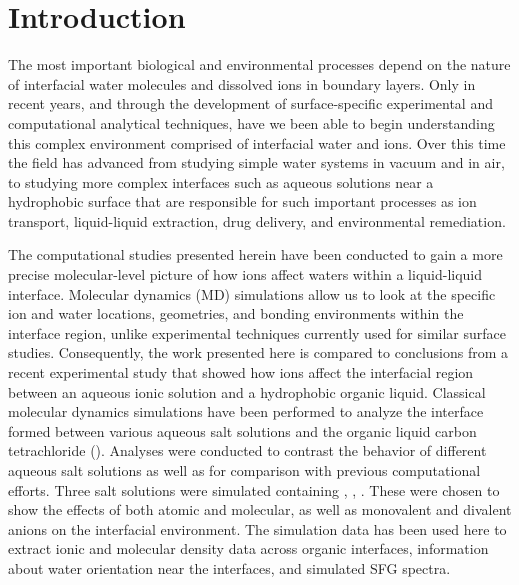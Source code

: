 \section{Introduction}

The most important biological and environmental processes depend on the nature of interfacial water molecules and dissolved ions in boundary layers. Only in recent years, and through the development of surface-specific experimental\cite{Charreteur2008,Chen2007,Luo2006} and computational\cite{Schnell2004,Wardle2005,Wick2008a} analytical techniques, have we been able to begin understanding this complex environment comprised of interfacial water and ions. Over this time the field has advanced from studying simple water systems in vacuum and in air, to studying more complex interfaces such as aqueous solutions near a hydrophobic surface that are responsible for such important processes as ion transport, liquid-liquid extraction, drug delivery, and environmental remediation. 

The computational studies presented herein have been conducted to gain a more precise molecular-level picture of how ions affect waters within a liquid-liquid interface. Molecular dynamics (MD) simulations allow us to look at the specific ion and water locations, geometries, and bonding environments within the interface region, unlike experimental techniques currently used for similar surface studies. Consequently, the work presented here is compared to conclusions from a recent experimental study that showed how ions affect the interfacial region between an aqueous ionic solution and a hydrophobic organic liquid.\cite{McFearin2009} Classical molecular dynamics simulations have been performed to analyze the interface formed between various aqueous salt solutions and the organic liquid carbon tetrachloride (\ctc). Analyses were conducted to contrast the behavior of different aqueous salt solutions as well as for comparison with previous computational efforts.\cite{Hore2007,Hore2008,Hore2007a,Walker2006b,Walker2007a,Walker2007b}  Three salt solutions were simulated containing \nacl, \sodnit, \sodsul. These were chosen to show the effects of both atomic and molecular, as well as monovalent and divalent anions on the interfacial environment. The simulation data has been used here to extract ionic and molecular density data across organic interfaces, information about water orientation near the interfaces, and simulated SFG spectra. 

